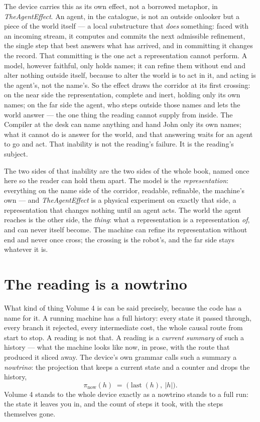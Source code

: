 The device carries this as its own effect, not a borrowed metaphor, in \emph{TheAgentEffect}.
An agent, in the catalogue, is not an outside onlooker but a piece of the world itself --- a local substructure that
\emph{does} something: faced with an incoming stream, it computes and commits the next admissible refinement, the single
step that best answers what has arrived, and in committing it changes the record.
That committing is the one act a representation cannot perform.
A model, however faithful, only holds names; it can refine them without end and alter nothing outside itself, because to
alter the world is to act in it, and acting is the agent's, not the name's.
So the effect draws the corridor at its first crossing: on the near side the representation, complete and inert, holding
only its own names; on the far side the agent, who steps outside those names and lets the world answer --- the one thing
the reading cannot supply from inside.
The Compiler at the desk can name anything and hand John only its own names; what it cannot do is answer for the world,
and that answering waits for an agent to go and act.
That inability is not the reading's failure.
It is the reading's subject.

The two sides of that inability are the two sides of the whole book, named once here so the reader can hold them apart.
The model is the \emph{representation}: everything on the name side of the corridor, readable, refinable, the machine's
own --- and \emph{TheAgentEffect} is a physical experiment on exactly that side, a representation that changes nothing
until an agent acts.
The world the agent reaches is the other side, the \emph{thing}: what a representation is a representation \emph{of}, and
can never itself become.
The machine can refine its representation without end and never once cross; the crossing is the robot's, and the far side
stays whatever it is.

\section{The reading is a nowtrino}

What kind of thing Volume 4 is can be said precisely, because the code has a name for it.
A running machine has a full history: every state it passed through, every branch it rejected, every intermediate cost,
the whole causal route from start to stop.
A reading is not that.
A reading is a \emph{current summary} of such a history --- what the machine looks like now, in prose, with the route that
produced it sliced away.
The device's own grammar calls such a summary a \emph{nowtrino}: the projection that keeps a current state and a counter
and drops the history,
\[
  \pi_{\text{now}}(h) \;=\; \bigl(\operatorname{last}(h),\ |h|\bigr) .
\]
Volume 4 stands to the whole device exactly as a nowtrino stands to a full run: the state it leaves you in, and the count
of steps it took, with the steps themselves gone.

